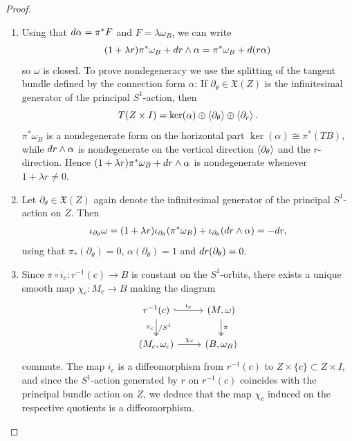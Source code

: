 \documentclass[10pt,a4paper]{amsart}
\renewcommand{\dd}{\textup{d}}
\begin{document}
\begin{proof}
    \begin{enumerate}
        \item Using that $\dd \alpha =\pi^* F$ and $F=\lambda \omega_B$, we can write
        \begin{equation*}
            (1+\lambda r)\pi^*\omega_B + \dd r\wedge \alpha= \pi^*\omega_B + \dd (r \alpha)
        \end{equation*}
        so $\omega$ is closed. To prove nondegeneracy we use the splitting of the tangent bundle defined by the connection form $\alpha$: If $\partial_\theta\in \mathfrak{X}(Z)$ is the infinitesimal generator of the principal $S^1$-action, then 
        \begin{equation*}
            T(Z\times I) = \ker(\alpha) \oplus \expval{\partial_\theta} \oplus \expval{\partial_r}.
        \end{equation*}
        $\pi^*\omega_B$ is a nondegenerate form on the horizontal part $\ker(\alpha)\cong\pi^*(TB)$, while $\dd r\wedge \alpha$ is nondegenerate on the vertical direction $\expval{\partial_\theta}$ and the $r$-direction. Hence $(1+\lambda r)\pi^*\omega_B +\dd r\wedge \alpha$ is nondegenerate whenever $1+\lambda r\neq 0$.
        \item Let $\partial_\theta\in \mathfrak{X}(Z)$ again denote the infinitesimal generator of the principal $S^1$-action on $Z$. Then
        \begin{align*}
            \iota_{\partial_\theta} \omega = (1+\lambda r)\iota_{\partial_\theta}(\pi^*\omega_B) + \iota_{\partial_\theta}(\dd r\wedge \alpha) =-\dd r,
        \end{align*}
        using that $\pi_*(\partial_\theta) = 0$, $\alpha(\partial_\theta)=1$ and $\dd r(\partial_\theta)=0$. 
        \item Since $\pi\circ i_c:r^{-1}(c)\to B$ is constant on the $S^1$-orbits, there exists a unique smooth map $\chi_c:M_c\to B$ making the diagram
    \begin{equation*}
        \begin{tikzcd}
            r^{-1}(c) \arrow[r, "i_c", hook] \arrow[d, "/S^1","\pi_c"', two heads] & {(M,\omega)} \arrow[d, "\pi", two heads] \\
            {(M_c,\omega_c)} \arrow[r, "\chi_c"]                              & {(B,\omega_B)}                               
        \end{tikzcd}
    \end{equation*}
    commute. The map $i_c$ is a diffeomorphism from $r^{-1}(c)$ to $Z \times \{c\} \subset Z \times I$, and since the $S^1$-action generated by $r$ on $r^{-1}(c)$ coincides with the principal bundle action on $Z$, we deduce that the map $\chi_c$ induced on the respective quotients is a diffeomorphism. 


\end{enumerate}
\end{proof}
\end{document}
